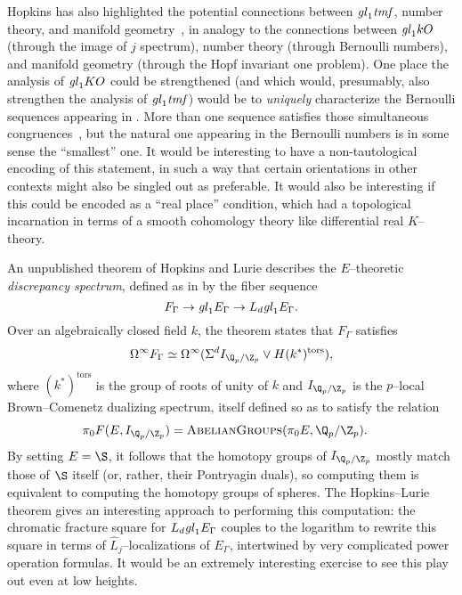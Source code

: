 Hopkins has also highlighted the potential connections between \(\mathit{gl}_1 \mathit{tmf}\), number theory, and manifold geometry~\cite{HopkinsTheStringOrientation}, in analogy to the connections between \(\mathit{gl}_1 kO\) (through the image of \(j\) spectrum), number theory (through Bernoulli numbers), and manifold geometry (through the Hopf invariant one problem).  One place the analysis of \(\mathit{gl}_1 KO\) could be strengthened (and which would, presumably, also strengthen the analysis of \(\mathit{gl}_1 \mathit{tmf}\)) would be to \emph{uniquely} characterize the Bernoulli sequences appearing in .  More than one sequence satisfies those simultaneous congruences~\cite{SprangNaumann}, but the natural one appearing in the Bernoulli numbers is in some sense the ``smallest'' one.  It would be interesting to have a non-tautological encoding of this statement, in such a way that certain orientations in other contexts might also be singled out as preferable.  It would also be interesting if this could be encoded as a ``real place'' condition, which had a topological incarnation in terms of a smooth cohomology theory like differential real \(K\)--theory.

An unpublished theorem of Hopkins and Lurie describes the \(E\)--theoretic \textit{discrepancy spectrum}, defined as in  by the fiber sequence \[F_\Gamma \to \mathit{gl}_1 E_\Gamma \to L_d \mathit{gl}_1 E_\Gamma.\]  Over an algebraically closed field \(k\), the theorem states that \(F_\Gamma\) satisfies \[\Loops^\infty F_\Gamma \simeq \Loops^\infty (\Susp^d I_{\Q_p/\Z_p} \vee H(k^*)^{\mathrm{tors}}),\] where \((k^*)^{\mathrm{tors}}\) is the group of roots of unity of \(k\) and \(I_{\Q_p/\Z_p}\) is the \(p\)--local Brown--Comenetz dualizing spectrum, itself defined so as to satisfy the relation
\begin{align*}
\pi_0 F(E, I_{\Q_p/\Z_p}) & = \CatOf{AbelianGroups}(\pi_0 E, \Q_p/\Z_p).
\end{align*}
By setting \(E = \S\), it follows that the homotopy groups of \(I_{\Q_p/\Z_p}\) mostly match those of \(\S\) itself (or, rather, their Pontryagin duals), so computing them is equivalent to computing the homotopy groups of spheres.  The Hopkins--Lurie theorem gives an interesting approach to performing this computation: the chromatic fracture square for \(L_d \mathit{gl}_1 E_\Gamma\) couples to the logarithm to rewrite this square in terms of \(\widehat L_j\)--localizations of \(E_\Gamma\), intertwined by very complicated power operation formulas.  It would be an extremely interesting exercise to see this play out even at low heights.


